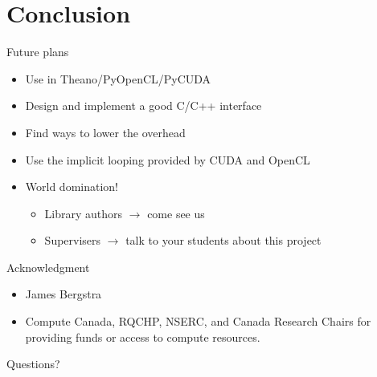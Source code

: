 \documentclass[utf8x,xcolor=pdftex,dvipsnames,table]{beamer}
\begin{document}

\section{Conclusion}
\begin{frame}{Future plans}
\begin{itemize}
\item<1-> Use in Theano/PyOpenCL/PyCUDA
\item<2-> Design and implement a good C/C++ interface
\item<3-> Find ways to lower the overhead
\item<4-> Use the implicit looping provided by CUDA and OpenCL
\item<5-> World domination!
\begin{itemize}
\item<6-> Library authors $\to$ come see us
\item<6-> Supervisers $\to$ talk to your students about this project
\end{itemize}
\end{itemize}
\end{frame}

\begin{frame}{Acknowledgment}
\begin{itemize}
\item James Bergstra
\item Compute Canada, RQCHP, NSERC, and Canada Research Chairs for providing funds or access to compute resources.
\end{itemize}
\end{frame}

\begin{frame}
\begin{center}
\Huge
Questions?
\end{center}
\end{frame}
\end{document}

